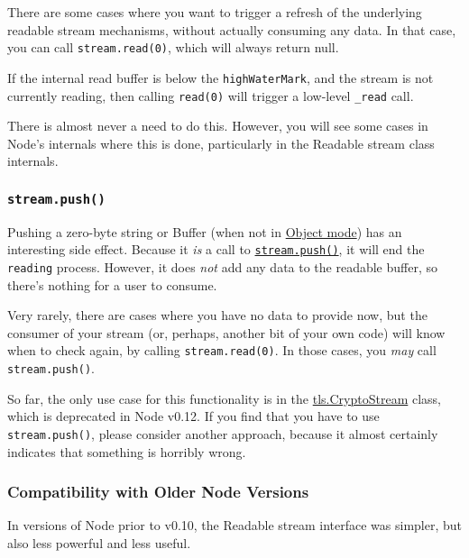 There are some cases where you want to trigger a refresh of the
underlying readable stream mechanisms, without actually consuming any
data. In that case, you can call \texttt{stream.read(0)}, which will
always return null.

If the internal read buffer is below the \texttt{highWaterMark}, and the
stream is not currently reading, then calling \texttt{read(0)} will
trigger a low-level \texttt{\_read} call.

There is almost never a need to do this. However, you will see some
cases in Node's internals where this is done, particularly in the
Readable stream class internals.

\subsubsection{\texorpdfstring{\texttt{stream.push(\textquotesingle{}\textquotesingle{})}}{stream.push('')}}\label{stream.push}

Pushing a zero-byte string or Buffer (when not in
\hyperref[streamux5fobjectux5fmode]{Object mode}) has an interesting
side effect. Because it \emph{is} a call to
\hyperref[streamux5freadableux5fpushux5fchunkux5fencoding]{\texttt{stream.push()}},
it will end the \texttt{reading} process. However, it does \emph{not}
add any data to the readable buffer, so there's nothing for a user to
consume.

Very rarely, there are cases where you have no data to provide now, but
the consumer of your stream (or, perhaps, another bit of your own code)
will know when to check again, by calling \texttt{stream.read(0)}. In
those cases, you \emph{may} call
\texttt{stream.push(\textquotesingle{}\textquotesingle{})}.

So far, the only use case for this functionality is in the
\href{tls.html\#tls_class_cryptostream}{tls.CryptoStream} class, which
is deprecated in Node v0.12. If you find that you have to use
\texttt{stream.push(\textquotesingle{}\textquotesingle{})}, please
consider another approach, because it almost certainly indicates that
something is horribly wrong.

\subsubsection{Compatibility with Older Node
Versions}\label{compatibility-with-older-node-versions}

In versions of Node prior to v0.10, the Readable stream interface was
simpler, but also less powerful and less useful.

